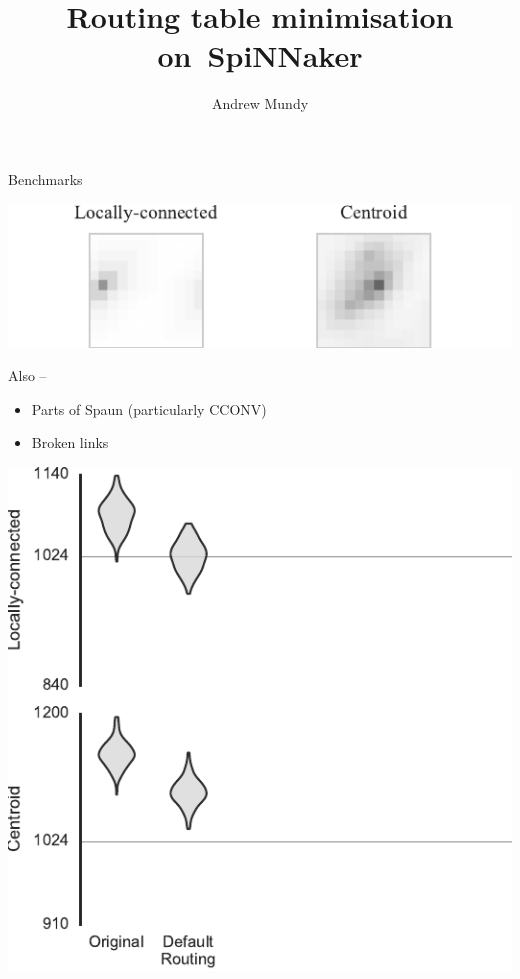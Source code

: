 \documentclass[t]{beamer}
\title{Routing table minimisation on~SpiNNaker}
\author{Andrew Mundy}
\begin{document}
\maketitle

\begin{frame}{Benchmarks}
  \begin{center}
    \includegraphics{../experiments/experiments}
  \end{center}

  Also --
  \begin{itemize}
    \item Parts of Spaun (particularly CCONV)
    \item Broken links
  \end{itemize}
\end{frame}

\begin{frame}[plain]{}
  \begin{center}
    \includegraphics[page=1]{../experiments/presentation_plots}
  \end{center}
\end{frame}
\end{document}
